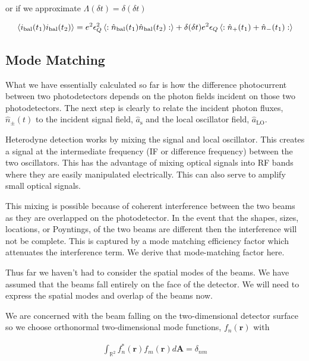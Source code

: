 \documentclass[12pt]{article}
\newcommand{\bv}[1]{\boldsymbol{#1}}
\begin{document}
or if we approximate $\Lambda(\delta t) = \delta(\delta t)$

\begin{align}
\label{balcurrent}
\Braket{i_{\text{bal}}(t_1)i_{\text{bal}}(t_2)} = e^2\epsilon_Q^2 \Braket{:\hat{n}_{\text{bal}}(t_1) \hat{n}_{\text{bal}}(t_2) :} + \delta(\delta t)e^2\epsilon_Q \Braket{: \hat{n}_+(t_1) + \hat{n}_-(t_1):}\\
\end{align}

\subsection{Mode Matching}

What we have essentially calculated so far is how the difference photocurrent between two photodetectors depends on the photon fields incident on those two photodetectors. The next step is clearly to relate the incident photon fluxes, $\hat{n}_{\pm}(t)$ to the incident signal field, $\hat{a}_{\text{s}}$ and the local oscillator field, $\hat{a}_{\text{LO}}$.

Heterodyne detection works by mixing the signal and local oscillator. This creates a signal at the intermediate frequency (IF or difference frequency) between the two oscillators. This has the advantage of mixing optical signals into RF bands where they are easily manipulated electrically. This can also serve to amplify small optical signals.

This mixing is possible because of coherent interference between the two beams as they are overlapped on the photodetector. In the event that the shapes, sizes, locations, or Poyntings, of the two beams are different then the interference will not be complete. This is captured by a mode matching efficiency factor which attenuates the interference term. We derive that mode-matching factor here.

Thus far we haven't had to consider the spatial modes of the beams. We have assumed that the beams fall entirely on the face of the detector. We will need to express the spatial modes and overlap of the beams now.

We are concerned with the beam falling on the two-dimensional detector surface so we choose orthonormal two-dimensional mode functions, $f_n(\bv{r})$ with

\begin{align}
\int_{\mathbb{R}^2} f_n^*(\bv{r}) f_m(\bv{r})d\bv{A} = \delta_{nm}
\end{align}
\end{document}
